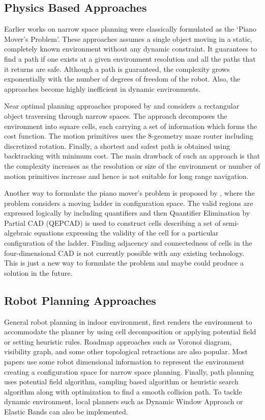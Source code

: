 \documentclass[rnd]{mas_proposal}
\begin{document}
\subsection{Physics Based Approaches}
Earlier works on narrow space planning were classically formulated as the ‘Piano Mover's Problem’. These approaches assumes a single object moving in a static, completely known environment without any dynamic constraint. It guarantees to find a path if one exists at a given environment resolution and all the paths that it returns are safe.
Although a path is guaranteed, the complexity grows exponentially with the number of degrees of freedom of the robot. Also, the approaches become highly inefficient in dynamic environments. 

Near optimal planning approaches proposed by \cite{1225154} and \cite{1511035} considers a rectangular object traversing through narrow spaces. The approach decomposes the environment into square cells, each carrying a set of information which forms the cost function. The motion primitives uses the 8-geometry maze router including discretized rotation. Finally, a shortest and safest path is obtained using backtracking with minimum cost. The main drawback of such an approach is that the complexity increases as the resolution or size of the environment or number of motion primitives increase and hence is not suitable for long range navigation. 

Another way to formulate the piano mover's problem is proposed by \cite{6821131}, where the problem considers a moving ladder in configuration space. The valid regions are expressed logically by including quantifiers and then Quantifier Elimination by Partial CAD (QEPCAD) is used to construct cells describing a set of semi-algebraic equations expressing the validity of the cell for a particular configuration of the ladder. Finding adjacency and connectedness of cells in the four-dimensional CAD is not currently possible with any existing technology. This is just a new way to formulate the problem and maybe could produce a solution in the future.

\subsection{Robot Planning Approaches}
General robot planning in indoor environment, first renders the environment to accommodate the planner by using cell decomposition or applying potential field or setting heuristic rules. Roadmap approaches such as Voronoi diagram, visibility graph, and some other topological retractions are also popular. Most papers use some robot dimensional information to represent the environment creating a configuration space for narrow space planning. Finally, path planning uses potential field algorithm, sampling based algorithm or heuristic search algorithm along with optimization to find a smooth collision path. To tackle dynamic environment, local planners such as Dynamic Window Approach or Elastic Bands can also be implemented.
\end{document}
